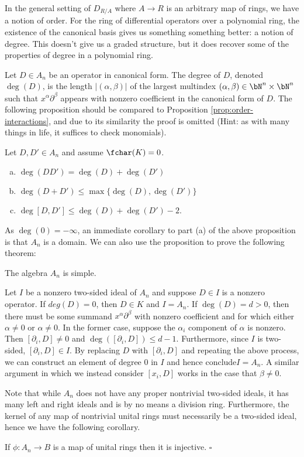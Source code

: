 In the general setting of $D_{R/A}$ where $A\to R$ is an arbitrary map of rings, we have a notion of order. For the ring of differential operators over a polynomial ring, the existence of the canonical basis gives us something something better: a notion of degree. This doesn't give us a graded structure, but it does recover some of the properties of degree in a polynomial ring. 

Let $D \in A_n$ be an operator in canonical form. The degree of $D$, denoted $\deg(D)$, is the length $|(\alpha,\beta)|$ of the largest multindex $(\alpha,\beta) \in \bN^n\times \bN^n$ such that $x^\alpha\partial^\beta$ appears with nonzero coefficient in the canonical form of $D$. The following proposition should be compared to Proposition \ref{prop:order-interactions}, and due to its similarity the proof is omitted (Hint: as with many things in life, it suffices to check monomials).
\begin{prop}\label{prop:degree-properties}
    Let $D,D' \in A_n$ and assume $\fchar(K) = 0$.
	\begin{enumerate}[(a)]
		\item $\deg(DD') = \deg(D) + \deg(D')$
		\item $\deg(D+D') \leq \max\{\deg(D), \deg(D')\}$
		\item $\deg[D,D']\leq \deg(D) + \deg(D') - 2$.
	\end{enumerate}
\end{prop}
As $\deg(0) = -\infty$, an immediate corollary to part (a) of the above proposition is that $A_n$ is a domain. We can also use the proposition to prove the following theorem:

\begin{thm}\label{thm:Weyl-algebra-simple}
	The algebra $A_n$ is simple.
\end{thm}
\begin{prf}
	Let $I$ be a nonzero two-sided ideal of $A_n$ and suppose $D \in I$ is a nonzero operator. If $deg(D) = 0$, then $D \in K$ and $I = A_n$. If $\deg(D) = d > 0$, then there must be some summand $x^\alpha\partial^\beta$ with nonzero coefficient and for which either $\alpha \neq 0$ or $\alpha \neq 0$. In the former case, suppose the $\alpha_i$ component of $\alpha$ is nonzero. Then $[\partial_i,D] \neq 0$ and $\deg([\partial_i,D]) \leq d - 1$. Furthermore, since $I$ is two-sided, $[\partial_i,D] \in I$. By replacing $D$ with $[\partial_i,D]$ and repeating the above process, we can construct an element of degree 0 in $I$ and hence conclude$I = A_n$. A similar argument in which we instead consider $[x_i,D]$ works in the case that $\beta \neq 0$.
\end{prf}
Note that while $A_n$ does not have any proper nontrivial two-sided ideals, it has many left and right ideals and is by no means a division ring. Furthermore, the kernel of any map of nontrivial unital rings must necessarily be a two-sided ideal, hence we have the following corollary.
\begin{cor}\label{cor:maps-from-Weyl-inj}
	If $\phi:A_n\to B$ is a map of unital rings then it is injective. \hfill $\square$
\end{cor}

